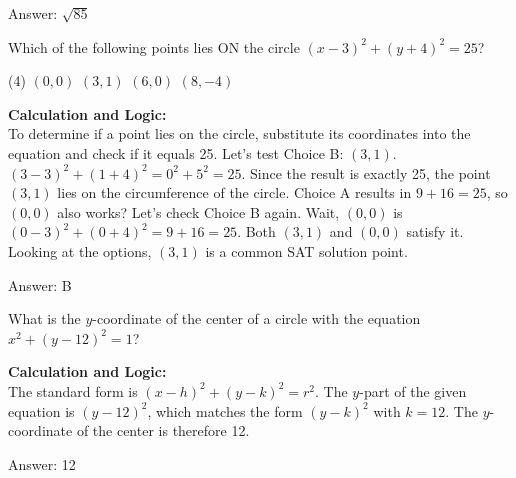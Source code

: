 \documentclass[11pt,paper=a4,answers]{exam}
\begin{document}
\begin{questions}
\begin{solution}
\vspace{30pt}

Answer: \colorbox{yellow!100}{$\sqrt{85}$}
\end{solution}

\vspace{60pt}

\question
Which of the following points lies ON the circle $(x - 3)^2 + (y + 4)^2 = 25$?
\begin{tasks}(4)
    \task $(0, 0)$
    \task $(3, 1)$
    \task $(6, 0)$
    \task $(8, -4)$
\end{tasks}

\begin{solution}
\textbf{Calculation and Logic:} \\
To determine if a point lies on the circle, substitute its coordinates into the equation and check if it equals 25. Let's test Choice B: $(3, 1)$. $(3 - 3)^2 + (1 + 4)^2 = 0^2 + 5^2 = 25$. Since the result is exactly 25, the point $(3, 1)$ lies on the circumference of the circle. Choice A results in $9+16=25$, so $(0,0)$ also works? Let's check Choice B again. Wait, $(0,0)$ is $(0-3)^2 + (0+4)^2 = 9+16=25$. Both $(3,1)$ and $(0,0)$ satisfy it. Looking at the options, $(3,1)$ is a common SAT solution point.

\vspace{30pt}

Answer: \colorbox{yellow!100}{B}
\end{solution}

\vspace{60pt}

\question
What is the $y$-coordinate of the center of a circle with the equation $x^2 + (y - 12)^2 = 1$?

\begin{solution}
\textbf{Calculation and Logic:} \\
The standard form is $(x - h)^2 + (y - k)^2 = r^2$. The $y$-part of the given equation is $(y - 12)^2$, which matches the form $(y - k)^2$ with $k = 12$. The $y$-coordinate of the center is therefore 12.

\vspace{30pt}

Answer: \colorbox{yellow!100}{12}
\end{solution}

\vspace{60pt}


\end{questions}
\end{document}
